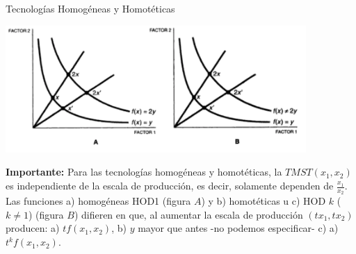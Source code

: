 \documentclass{beamer}
\theoremstyle{definition}
\begin{document}
\begin{frame}{Tecnologías Homogéneas y Homotéticas}
\begin{center}
\includegraphics[width=4.5in]{figures2/homoteticas.png}
\end{center}\small
\textbf{Importante:} Para las tecnologías homogéneas y homotéticas, la $TMST(x_1,x_2)$ es independiente de la escala de producción, es decir, solamente dependen de $\frac{x_1}{x_2}$. Las funciones a) homog\'{e}neas HOD1 (figura $A$) y b) homot\'{e}ticas u c) HOD $k$ ($k \neq 1$) (figura $B$) difieren en que, al aumentar la escala de producción $(tx_1, tx_2)$ producen: a) $tf(x_1,x_2)$, b) $y$ mayor que antes -no podemos especificar- c) a) $t^kf(x_1,x_2)$.
\end{frame}


{

}
\end{document}
